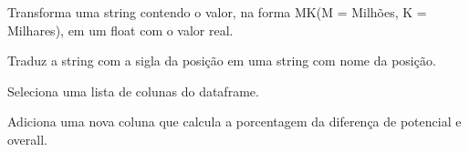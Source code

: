 \documentclass[letterpaper,10pt,brazil]{sphinxmanual}
\begin{document}
\begin{fulllineitems}
\begin{fulllineitems}
\end{fulllineitems}


\begin{fulllineitems}
\label{\detokenize{classe_Fifa_limp:classe_Fifa_limp.Fifa_limp.trocar_valores_str_p_int}}
Transforma uma string contendo o valor, na forma MK(M = Milhões, K = Milhares), em um float com o valor real.

\end{fulllineitems}


\begin{fulllineitems}
\label{\detokenize{classe_Fifa_limp:classe_Fifa_limp.Fifa_limp.traduzir_posicoes}}
Traduz a string com a sigla da posição em uma string com nome da posição.

\end{fulllineitems}


\begin{fulllineitems}
\label{\detokenize{classe_Fifa_limp:classe_Fifa_limp.Fifa_limp.colunas_desejadas}}
Seleciona uma lista de colunas do dataframe.

\end{fulllineitems}


\begin{fulllineitems}
\label{\detokenize{classe_Fifa_limp:classe_Fifa_limp.Fifa_limp.porcentagem_overall_potential}}
Adiciona uma nova coluna que calcula a porcentagem da diferença de potencial e overall.


\end{fulllineitems}
\end{fulllineitems}
\end{document}
